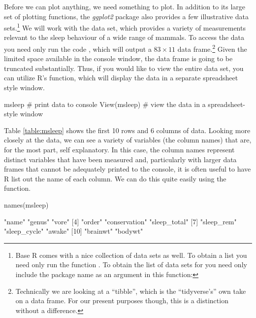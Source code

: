 Before we can plot anything, we need something to plot.  In addition to its large set of plotting functions, the \textit{ggplot2} package also provides a few illustrative data sets.\footnote{Base R comes with a nice collection of data sets as well. To obtain a list you need only run the function .  To obtain the list of data sets for  you need only include the package name as an argument in this function: } We will work with the  data set, which provides a variety of measurements relevant to the sleep behaviour of a wide range of mammals. To access the data you need only run the code , which will output a $83 \times 11$ data frame.\footnote{Technically we are looking at a ``tibble'', which is the ``tidyverse's'' own take on a data frame. For our present purposes though, this is a distinction without a difference.} Given the limited space available in the console window, the data frame is going to be truncated substantially. Thus, if you would like to view the entire data set, you can utilize R's  function, which will display the data in a separate spreadsheet style window.

\begin{inR}
msleep # print data to console
View(msleep) # view the data in a spreadsheet-style window
\end{inR}

\vspace{2em}



\noindent
Table \ref{table:msleep} shows the first 10 rows and 6 columns of  data.  Looking more closely at the data, we can see a variety of variables (the column names) that are, for the most part, self explanatory.
In this case, the column names represent distinct variables that have been measured and, particularly with larger data frames that cannot be adequately printed to the console, it is often useful to have R list out the name of each column. We can do this quite easily using the  function.

\begin{inR}
names(msleep)
\end{inR}
\begin{outR}
 [1] "name"         "genus"        "vore"        
 [4] "order"        "conservation" "sleep_total" 
 [7] "sleep_rem"    "sleep_cycle"  "awake"       
[10] "brainwt"      "bodywt"   
\end{outR}

